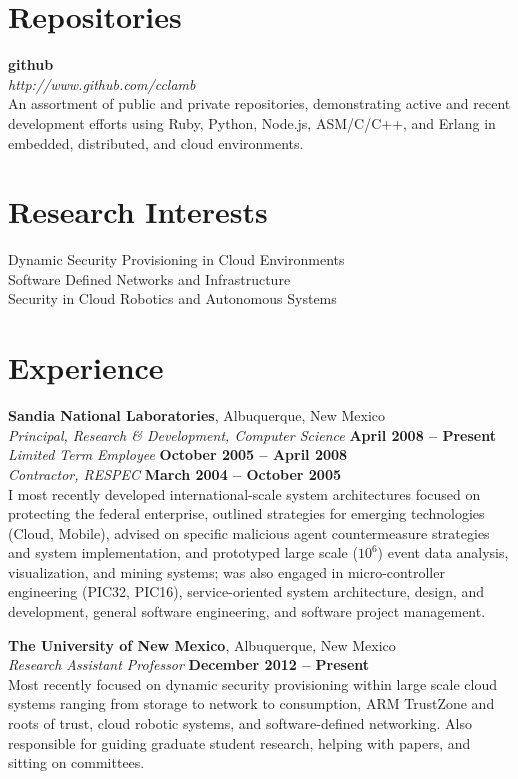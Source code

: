 \documentclass[margin,line]{resume}
\begin{document}
\begin{resume}
\section{\mysidestyle Repositories}
{\bf github} \vspace{2mm}  \\
{\sl http://www.github.com/cclamb} \vspace{1mm} \\
An assortment of public and private repositories, demonstrating active and recent development efforts using Ruby, Python, Node.js, ASM/C/C++, and Erlang in embedded, distributed, and cloud environments.

\section{\mysidestyle Research Interests}
Dynamic Security Provisioning in Cloud Environments \\
Software Defined Networks and Infrastructure \\
Security in Cloud Robotics and Autonomous Systems

\section{\mysidestyle Experience}
{\bf Sandia National Laboratories}, Albuquerque, New Mexico \vspace{2mm} \\
{\sl Principal, Research \& Development, Computer Science} \hfill \textbf{April 2008 -- Present} \\
{\sl Limited Term Employee} \hfill \textbf{October 2005 -- April 2008} \\\vspace{1mm}%
{\sl Contractor, RESPEC} \hfill \textbf{March 2004 -- October 2005} \\
I most recently developed international-scale system architectures focused on protecting the federal enterprise, outlined strategies for emerging technologies (Cloud, Mobile), advised on specific malicious agent countermeasure strategies and system implementation, and prototyped large scale ($10^6$) event data analysis, visualization, and mining systems; was also engaged in micro-controller engineering (PIC32, PIC16), service-oriented system architecture, design, and development, general software engineering, and software project management.

{\bf The University of New Mexico}, Albuquerque, New Mexico \vspace{2mm} \\\vspace{1mm}%
{\sl Research Assistant Professor} \hfill \textbf{December 2012 -- Present} \\
Most recently focused on dynamic security provisioning within large scale cloud systems ranging from storage to network to consumption, ARM TrustZone and roots of trust, cloud robotic systems, and software-defined networking.  Also responsible for guiding graduate student research, helping with papers, and sitting on committees.


\end{resume}
\end{document}
